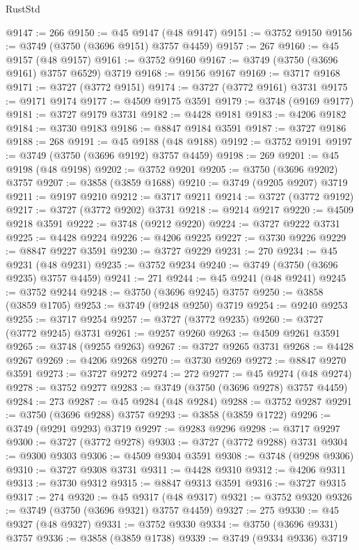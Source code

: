 \begin{lexlean}{RustStd}
\begin{coremodule}
@9147 := 266
@9150 := @45 @9147 (@48 @9147)
@9151 := @3752 @9150
@9156 := @3749 (@3750 (@3696 @9151) @3757 @4459)
@9157 := 267
@9160 := @45 @9157 (@48 @9157)
@9161 := @3752 @9160
@9167 := @3749 (@3750 (@3696 @9161) @3757 @6529) @3719
@9168 := @9156 @9167
@9169 := @3717 @9168
@9171 := @3727 (@3772 @9151)
@9174 := @3727 (@3772 @9161) @3731
@9175 := @9171 @9174
@9177 := @4509 @9175 @3591
@9179 := @3748 (@9169 @9177)
@9181 := @3727 @9179 @3731
@9182 := @4428 @9181
@9183 := @4206 @9182
@9184 := @3730 @9183
@9186 := @8847 @9184 @3591
@9187 := @3727 @9186
@9188 := 268
@9191 := @45 @9188 (@48 @9188)
@9192 := @3752 @9191
@9197 := @3749 (@3750 (@3696 @9192) @3757 @4459)
@9198 := 269
@9201 := @45 @9198 (@48 @9198)
@9202 := @3752 @9201
@9205 := @3750 (@3696 @9202) @3757
@9207 := @3858 (@3859 @1688)
@9210 := @3749 (@9205 @9207) @3719
@9211 := @9197 @9210
@9212 := @3717 @9211
@9214 := @3727 (@3772 @9192)
@9217 := @3727 (@3772 @9202) @3731
@9218 := @9214 @9217
@9220 := @4509 @9218 @3591
@9222 := @3748 (@9212 @9220)
@9224 := @3727 @9222 @3731
@9225 := @4428 @9224
@9226 := @4206 @9225
@9227 := @3730 @9226
@9229 := @8847 @9227 @3591
@9230 := @3727 @9229
@9231 := 270
@9234 := @45 @9231 (@48 @9231)
@9235 := @3752 @9234
@9240 := @3749 (@3750 (@3696 @9235) @3757 @4459)
@9241 := 271
@9244 := @45 @9241 (@48 @9241)
@9245 := @3752 @9244
@9248 := @3750 (@3696 @9245) @3757
@9250 := @3858 (@3859 @1705)
@9253 := @3749 (@9248 @9250) @3719
@9254 := @9240 @9253
@9255 := @3717 @9254
@9257 := @3727 (@3772 @9235)
@9260 := @3727 (@3772 @9245) @3731
@9261 := @9257 @9260
@9263 := @4509 @9261 @3591
@9265 := @3748 (@9255 @9263)
@9267 := @3727 @9265 @3731
@9268 := @4428 @9267
@9269 := @4206 @9268
@9270 := @3730 @9269
@9272 := @8847 @9270 @3591
@9273 := @3727 @9272
@9274 := 272
@9277 := @45 @9274 (@48 @9274)
@9278 := @3752 @9277
@9283 := @3749 (@3750 (@3696 @9278) @3757 @4459)
@9284 := 273
@9287 := @45 @9284 (@48 @9284)
@9288 := @3752 @9287
@9291 := @3750 (@3696 @9288) @3757
@9293 := @3858 (@3859 @1722)
@9296 := @3749 (@9291 @9293) @3719
@9297 := @9283 @9296
@9298 := @3717 @9297
@9300 := @3727 (@3772 @9278)
@9303 := @3727 (@3772 @9288) @3731
@9304 := @9300 @9303
@9306 := @4509 @9304 @3591
@9308 := @3748 (@9298 @9306)
@9310 := @3727 @9308 @3731
@9311 := @4428 @9310
@9312 := @4206 @9311
@9313 := @3730 @9312
@9315 := @8847 @9313 @3591
@9316 := @3727 @9315
@9317 := 274
@9320 := @45 @9317 (@48 @9317)
@9321 := @3752 @9320
@9326 := @3749 (@3750 (@3696 @9321) @3757 @4459)
@9327 := 275
@9330 := @45 @9327 (@48 @9327)
@9331 := @3752 @9330
@9334 := @3750 (@3696 @9331) @3757
@9336 := @3858 (@3859 @1738)
@9339 := @3749 (@9334 @9336) @3719

\end{coremodule}
\end{lexlean}
